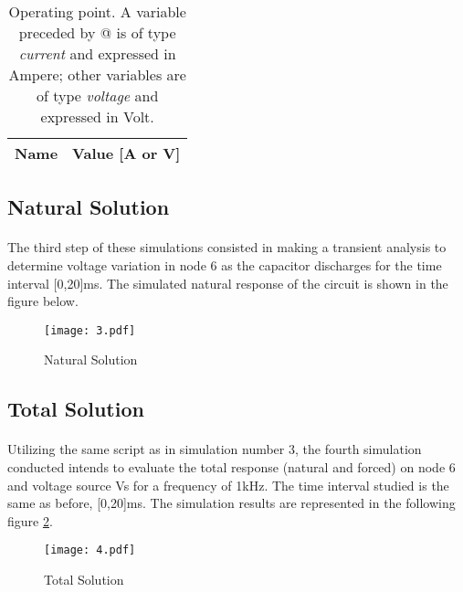 \begin{table}[H]
  \centering
  \begin{tabular}{|c|c|}
    \hline    
    {\bf Name} & {\bf Value [A or V]} \\ \hline
    
  \end{tabular}
  \caption{Operating point. A variable preceded by @ is of type {\em current}
    and expressed in Ampere; other variables are of type {\it voltage} and expressed in
    Volt.}
  \label{sim2}
\end{table}

\newpage{}
\subsection{Natural Solution}
\paragraph{}

\par The third step of these simulations consisted in making a transient analysis to determine voltage variation in node 6 as the capacitor discharges for the time interval [0,20]ms. The simulated natural response of the circuit is shown in the figure below.



\begin{figure}[H]
    \texttt{[image: 3.pdf]}
    \centering
    \caption{Natural Solution}
    \label{mag}
\end{figure}



\subsection{Total Solution}
\paragraph{}

\par Utilizing the same script as in simulation number 3, the fourth simulation conducted intends to evaluate the total response (natural and forced) on node 6 and voltage source Vs for a frequency of 1kHz. The time interval studied is the same as before, [0,20]ms. The simulation results are represented in the following figure \ref{total}.

\begin{figure}[H]
    \texttt{[image: 4.pdf]}
    \centering
    \caption{Total Solution}
    \label{total}
\end{figure}

